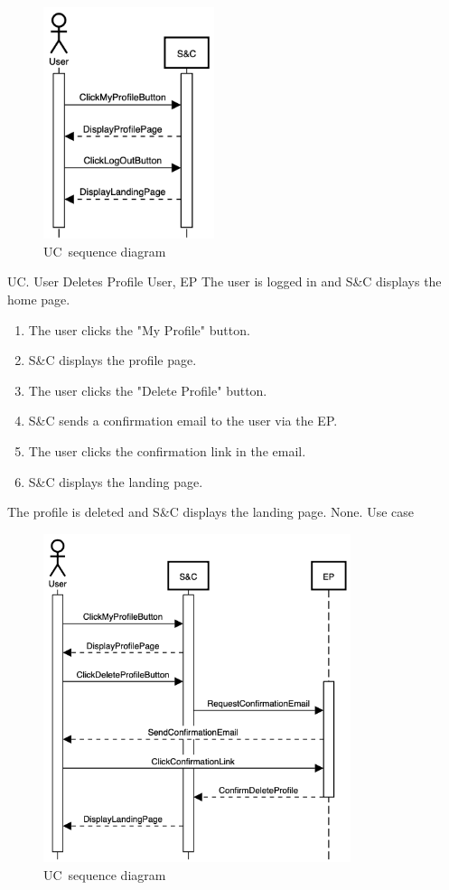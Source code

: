 \begin{figure}[h]
    \centering
    \includegraphics[width=5cm]{images/sequence-diagrams/user-logs-out.png}
    \caption{UC\theuc\ sequence diagram}
\end{figure}


\clearpage
\begin{usecase}
    {UC\theuc. User Deletes Profile}
    {User, EP}
    {The user is logged in and S\&C displays the home page.}
    {\begin{enumerate}[leftmargin=*]
        \item The user clicks the "My Profile" button.
        \item S\&C displays the profile page.
        \item The user clicks the "Delete Profile" button.
        \item S\&C sends a confirmation email to the user via the EP.
        \item The user clicks the confirmation link in the email.
        \item S\&C displays the landing page.
    \end{enumerate}}
    {The profile is deleted and S\&C displays the landing page.}
    {None.}
    {Use case \theuc}
\end{usecase}

\begin{figure}[h]
    \centering
    \includegraphics[width=9cm]{images/sequence-diagrams/user-deletes-profile.png}
    \caption{UC\theuc\ sequence diagram}
\end{figure}

